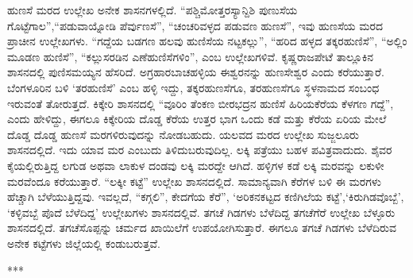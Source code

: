 ಹುಣಸೆ ಮರದ ಉಲ್ಲೇಖ ಅನೇಕ ಶಾಸನಗಳಲ್ಲಿದೆ. “ಪಶ್ಚಿಮೋತ್ತರಸ್ಯಾನ್ದಿಶಿ ಪುಣುಸೆಯ ಗೊಟ್ಟೆಗಾಲ”,\break “ಪಡುವಾಯ್ನೋಡಿ ಪೆರ್ವುಣಸೆ”, “ಚಂಚರಿವಳ್ಳದ ಪಡುವಣ ಹುಣಸೆ”, ಇವು ಹುಣಸೆಯ ಮರದ ಪ್ರಾಚೀನ ಉಲ್ಲೇಖಗಳು. “ಗದ್ದೆಯ ಬಡಗಣ ಹಲವು ಹುಣಿಸೆಯ ನಟ್ಟಕಲ್ಲು”, “ಹರಿದ ಹಳ್ಳದ ತಕ್ಕರಹುಣಿಸೆ”, “ಅಲ್ಲಿಂ ಮೂಡಣ ಹುಣಿಸೆ”, “ಕಲ್ಲುಸರಡಿನ ಎಣೆಹುಣಿಸೆಗಳಿಂ”, ಎಂಬ ಉಲ್ಲೇಖಗಳಿವೆ. ಕೃಷ್ಣರಾಜಪೇಟೆ ತಾಲ್ಲೂಕಿನ ಶಾಸನದಲ್ಲಿ ಪುಣಿಸಮಯ್ಯನ ಹೆಸರಿದೆ. ಅಗ್ರಹಾರಬಾಚಹಳ್ಳಿಯ ಈಶ್ವರನನ್ನು ಹುಣಸೇಶ್ವರ ಎಂದು ಕರೆಯುತ್ತಾರೆ. ಬೆಂಗಳೂರಿನ ಬಳಿ ‘ತರಹುಣಿಸೆ’ ಎಂಬ ಹಳ್ಳಿ ಇದ್ದು, ತಕ್ಕರಹುಣಸೆಗೂ, ತರಹುಣಸೆಗೂ ಸ್ಥಳನಾಮದ ಸಂಬಂಧ ಇರುವಂತೆ ತೋರುತ್ತದೆ. ಕಿಕ್ಕೇರಿ ಶಾಸನದಲ್ಲಿ “ವೂರಿಂ ತೆಂಕಣ ಬೀರಭದ್ರನ ಹುಣಿಸೆ ಹಿರಿಯಕೆರೆಯ ಕೆಳಗಣ ಗದ್ದೆ”, ಎಂದು ಹೇಳಿದ್ದು, ಈಗಲೂ ಕಿಕ್ಕೇರಿಯ ದೊಡ್ಡ ಕೆರೆಯ ಉತ್ತರ ಭಾಗ ಒಂದು ಕಡೆ ಮತ್ತು ಕೆರೆಯ ಏರಿಯ ಮೇಲೆ ದೊಡ್ಡ ದೊಡ್ಡ ಹುಣಸೆ ಮರಗಳಿರುವುದನ್ನು ನೋಡಬಹುದು. ಯಲವದ ಮರದ ಉಲ್ಲೇಖ ಸುಜ್ಜಲೂರು ಶಾಸನದಲ್ಲಿದೆ. ಇದು ಯಾವ ಮರ ಎಂಬುದು ತಿಳಿದುಬರುವುದಿಲ್ಲ. ಲಕ್ಕಿ ಪತ್ರೆಯು ಬಹಳ ಪವಿತ್ರವಾದುದು. ಶೈವರ ಕೈಯಲ್ಲಿರುತ್ತಿದ್ದ ಲಗುಡ ಅಥವಾ ಲಾಕುಳ ದಂಡವು ಲಕ್ಕಿ ಮರದ್ದೇ ಆಗಿದೆ. ಹಳ್ಳಿಗಳ ಕಡೆ ಲಕ್ಕಿ ಮರ\break ವನ್ನು ಲಕುಳೀ ಮರವೆಂದೂ ಕರೆಯುತ್ತಾರೆ. “ಲಕ್ಕೀ ಕಟ್ಟೆ” ಉಲ್ಲೇಖ ಶಾಸನದಲ್ಲಿದೆ. ಸಾಮಾನ್ಯವಾಗಿ ಕೆರೆಗಳ ಬಳಿ ಈ ಮರಗಳು ಹೆಚ್ಚಾಗಿ ಬೆಳೆಯುತ್ತಿದ್ದವು. ಇವಲ್ಲದೆ, “ಕಗ್ಗಲಿ”, ಕೇದಗೆಯ ಕೆರೆ”, ‘ಅರಿಕನಕಟ್ಟದ ಕಣಿಗಿಲೆಯ ಕಟ್ಟೆ’,\break ‘ಕಿರುಗಿಡವೊಬ್ಬೆ’, ‘ಕಳ್ಳಿವಬ್ಬೆ ಪೊದೆ ಬೆಳೆದಿದ್ದ’ ಉಲ್ಲೇಖಗಳು ಶಾಸನದಲ್ಲಿವೆ. ತಗಚೆ ಗಿಡಗಳು ಬೆಳೆದಿದ್ದ ತಗಚೆಗೆರೆ ಉಲ್ಲೇಖ ಬೆಳ್ಳೂರು ಶಾಸನದಲ್ಲಿದೆ. ತಗಚೆಸೊಪ್ಪನ್ನು ಚರ್ಮದ ಖಾಯಿಲೆಗೆ ಉಪಯೋಗಿಸುತ್ತಾರೆ. ಈಗಲೂ ತಗಚೆ ಗಿಡಗಳು ಬೆಳೆದಿರುವ ಅನೇಕ ಕಟ್ಟೆಗಳು ಜಿಲ್ಲೆಯಲ್ಲಿ ಕಂಡುಬರುತ್ತವೆ.

\begin{center}
***
\end{center}

\theendnotes

